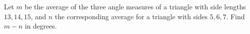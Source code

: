 Let $m$ be the average of the three angle measures of a triangle with side lengths $13,14,15$, and $n$ the corresponding average for a triangle with sides $5,6,7$. Find $m-n$ in degrees.
